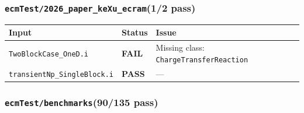 \documentclass[10pt,letterpaper]{article}
\newcommand{\PASS}{\textcolor{passgreen}{\textbf{PASS}}}
\newcommand{\FAIL}{\textcolor{failred}{\textbf{FAIL}}}
\newcommand{\code}[1]{\texttt{\small #1}}
\begin{document}
\subsubsection{\code{ecmTest/2026\_paper\_keXu\_ecram}\hfill (1/2 pass)}
\begin{longtable}{p{} l p{}}
\toprule
Input & Status & Issue \\
\midrule
\endhead
\code{TwoBlockCase\_OneD.i} & \FAIL & Missing class: \code{ChargeTransferReaction} \\
\code{transientNp\_SingleBlock.i} & \PASS & --- \\
\bottomrule
\end{longtable}

\subsubsection{\code{ecmTest/benchmarks}\hfill (90/135 pass)}
\end{document}

